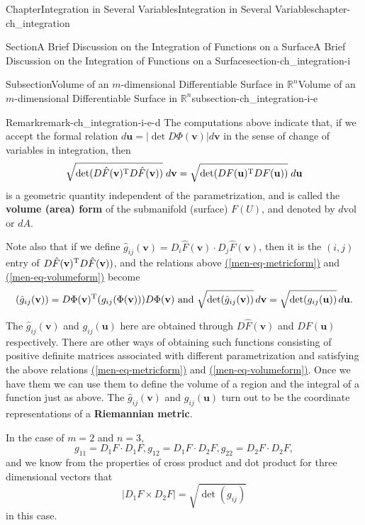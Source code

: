 \documentclass[oneside,10pt,]{book}
\newcommand{\xreffont}{\relax}
\newcommand{\terminology}[1]{\textbf{#1}}
\numberwithin{equation}{section}
\newcommand{\bu}{\mathbf{u}}
\newcommand{\bv}{\mathbf{v}}
\newcommand{\bbR}{\mathbb{R}}
\begin{document}
\begin{chapterptx}{Chapter}{Integration in Several Variables}{}{Integration in Several Variables}{}{}{chapter-ch_integration}
\begin{sectionptx}{Section}{A Brief Discussion on the Integration of Functions on a Surface}{}{A Brief Discussion on the Integration of Functions on a Surface}{}{}{section-ch_integration-i}
\begin{subsectionptx}{Subsection}{Volume of an \(m\)-dimensional Differentiable Surface in \(\bbR^{n}\)}{}{Volume of an \(m\)-dimensional Differentiable Surface in \(\bbR^{n}\)}{}{}{subsection-ch_integration-i-e}
\begin{remark}{Remark}{}{remark-ch_integration-i-e-d}%
The computations above indicate that, if we accept the formal relation \(d\bu = |\det D\Phi (\bv)| d\bv\) in the sense of change of variables in integration, then%
\begin{equation*}
\sqrt {\det ({D\hat F}(\bv)^{\rm T} {D\hat F}(\bv))}\; d\bv
=  \sqrt {\det (DF(\bu)^{\rm T} DF(\bu))}\; d\bu
\end{equation*}
is a geometric quantity independent of the parametrization, and is called the \terminology{volume (area) form} of the submanifold (surface) \(F(U)\), and denoted by \(d \text{vol}\) or \(d A\).%
\par
Note also that if we define \(\hat g_{ij}(\bv)=D_{i}\hat F(\bv)\cdot D_{j}\hat F(\bv)\), then it is the \((i, j)\) entry of \({D\hat F}(\bv)^{\rm T} {D\hat F}(\bv))\), and the relations above  \hyperref[men-eq-metricform]{({\xreffont\ref{men-eq-metricform}})} and \hyperref[men-eq-volumeform]{({\xreffont\ref{men-eq-volumeform}})} become%
\begin{equation*}
(\hat g_{ij}(\bv))=D\Phi(\bv)^{\rm T} (g_{ij}(\Phi(\bv))) D\Phi(\bv)
\text{ and }  \sqrt{\det (\hat g_{ij}(\bv))}\, d\bv = \sqrt{\det (g_{ij}(\bu))}\, d\bu.
\end{equation*}
%
\par
The \(\hat g_{ij}(\bv)\) and \(g_{ij}(\bu)\) here are obtained through \(D\hat F(\bv)\) and \(DF(\bu)\) respectively. There are other ways of obtaining such functions consisting of positive definite matrices associated with different parametrization and satisfying the above relations \hyperref[men-eq-metricform]{({\xreffont\ref{men-eq-metricform}})} and \hyperref[men-eq-volumeform]{({\xreffont\ref{men-eq-volumeform}})}. Once we have them we can use them to define the volume of a region and the integral of a function just as above. The \(\hat g_{ij}(\bv)\) and \(g_{ij}(\bu)\) turn out to be the coordinate representations of a \terminology{Riemannian metric}.%
\end{remark}
In the case of \(m=2\) and \(n=3\),%
\begin{equation*}
g_{11}=D_{1}F\cdot D_{1}F, g_{12}=D_{1}F\cdot D_{2}F, 
g_{22}=D_{2}F\cdot D_{2}F,
\end{equation*}
and we know from the properties of cross product and dot product for three dimensional vectors that%
\begin{equation*}
|D_{1}F\times D_{2}F|=\sqrt{\det (g_{ij})}
\end{equation*}
in this case.%

\end{subsectionptx}
\end{sectionptx}
\end{chapterptx}
\end{document}
